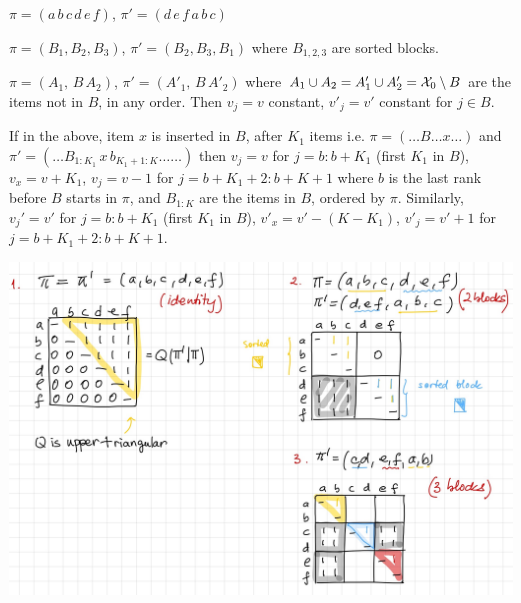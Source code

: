 \documentclass[10pt]{article}
\newlength{\picwi}
\newlength{\tttwi}
\begin{document}
\item $\pi=(a\,b\,c\,d\,e\,f)$, $\pi'=(d\,e\,f\,a\,b\,c)$

\item $\pi=( B_1, B_2, B_3)$, $\pi'=(B_2, B_3, B_1)$ where $B_{1,2,3}$ are sorted blocks.


\item $\pi=(A_1,\, B\,A_2)$, $\pi'=(A'_1,\, B\,A'_2)$ where $A_1\cup A_2=A'_1\cup A'_2={\mathcal X}_0\setminus B$ are the items not in $B$, in any order. Then $v_j=v$ constant, $v'_j=v'$ constant for $j\in B$.

  \item If in the above, item $x$ is inserted in $B$, after $K_1$ items
i.e. $\pi=(\ldots B \ldots x\ldots)$ and $\pi'=(\ldots
B_{1:K_1}\,x\,b_{K_1+1:K}\ldots \ldots)$ then $v_j=v$ for $j=b:b+K_1$
(first $K_1$ in $B$), $v_x=v+K_1$, $v_j=v-1$ for $j=b+K_1+2:b+K+1$
where $b$ is the last rank before $B$ starts in $\pi$, and $B_{1:K}$ are the items in $B$, ordered by $\pi$. Similarly, $v_j'=v'$
for $j=b:b+K_1$ (first $K_1$ in $B$), $v'_x=v'-(K-K_1)$, $v'_j=v'+1$ for
$j=b+K_1+2:b+K+1$.
  \eenum

\setlength{\picwi}{\tttwi}
\includegraphics[width=\picwi]{Figs/fig-blocks-Qid-bl.jpg}
\end{document}

